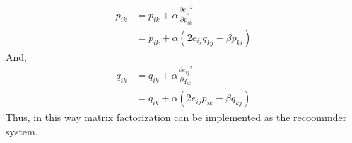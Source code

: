 \begin{equation}
\begin{split}
	p_{ik} &= p_{ik} + \alpha \frac{\partial {e_{ij}}^2}{\partial p_{ik}} \\ 
	& = p_{ik}  + \alpha (2e_{ij} q_{kj} - \beta p_{ki})
\end{split}
\end{equation}
And,
\begin{equation}
\begin{split}
	q_{ik} &= q_{ik} + \alpha \frac{\partial {e_{ij}}^2}{\partial q_{ik}} \\ 
	& = q_{ik}  + \alpha (2e_{ij} p_{ik} - \beta q_{kj})
\end{split}
\end{equation}
Thus, in this way matrix factorization can be implemented as the recoommder system.
